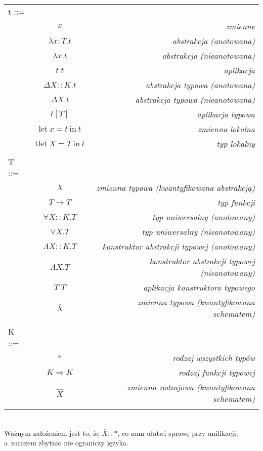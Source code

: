 \documentclass[11pt,leqno]{article}
\begin{document}
\begin{tabular}{| l c r |}
  \hline
  t ::= &  &  \\
   & $x$ & \textit{zmienne}  \\
   & $\lambda x:T.t$ & \textit{abstrakcja (anotowana)} \\
   & $\lambda x.t$ & \textit{abstrakcja (nieanotowana)} \\
   & $t\;t$ & \textit{aplikacja} \\
   & $\Delta X::K.t$ & \textit{abstrakcja typowa (anotowana)} \\
   & $\Delta X.t$ & \textit{abstrakcja typowa (nieanotowana)} \\
   & $t[T]$ & \textit{aplikacja typowa} \\
   & $\textrm{let} \ x = t \ \textrm{in} \ t$ & \textit{zmienna lokalna} \\
   & $\textrm{tlet} \ X = T \ \textrm{in} \ t$ & \textit{typ lokalny} \\
   & & \\
  T ::= &  &  \\
   & $X$ & \textit{zmienna typowa (kwantyfikowana abstrakcją)} \\
   & $T \rightarrow T$ & \textit{typ funkcji} \\
   & $\forall X::K.T$ & \textit{typ uniwersalny (anotowany)} \\
   & $\forall X.T$ & \textit{typ uniwersalny (nieanotowany)} \\
   & $\Lambda X::K.T$ & \textit{konstruktor abstrakcji typowej (anotowany)} \\
   & $\Lambda X.T$ & \textit{konstruktor abstrakcji typowej (nieanotowany)} \\
   & $T\;T$ & \textit{aplikacja konstruktora typowego} \\
   & $\bar{X}$ & \textit{zmienna typowa (kwantyfikowana schematem)} \\
   & & \\
  K ::= & & \\
   & $*$ & \textit{rodzaj wszystkich typów} \\
   & $K \Rightarrow K$ & \textit{rodzaj funkcji typowej} \\
   & $\widehat{X}$ & \textit{zmienna rodzajowa (kwantyfikowana schematem)} \\
   & & \\
  \hline
\end{tabular} \\

Ważnym założeniem jest to, że $\bar{X}::*$, co nam ułatwi sprawę przy unifikacji, a~zarazem zbytnio nie ograniczy języka.
  
\end{document}
